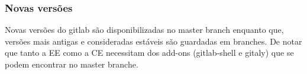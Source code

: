 \documentclass[12pt,a4paper]{article}
\begin{document}
\subsubsection{Novas versões}
Novas versões do gitlab são disponibilizadas no master branch enquanto que, versões mais antigas e consideradas estáveis são guardadas em branches. De notar que tanto  a EE como a CE necessitam dos add-ons (gitlab-shell e gitaly) que se podem encontrar no master branche.
\fi
\end{document}
